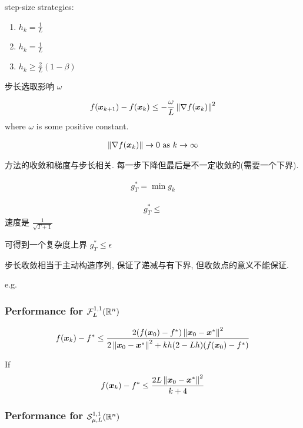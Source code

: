 step-size strategies:
\begin{enumerate}
    \item $h_k=\frac{1}{L}$
    \item $h_k=\frac{1}{L}$
    \item $h_k\ge \frac{2}{L}(1-\beta)$
\end{enumerate}
步长选取影响 $\omega$

\begin{align*}
    f(\bm{x}_{k+1})-f(\bm{x}_k)\le -\frac{\omega}{L}\left\lVert\nabla f(\bm{x}_k)\right\rVert^2
\end{align*}
where $\omega$ is some positive constant. 

\begin{align*}
    \left\lVert\nabla f(\bm{x}_k)\right\rVert\to 0\text{ as }k\to \infty
\end{align*}

方法的收敛和梯度与步长相关. 每一步下降但最后是不一定收敛的(需要一个下界). 

\begin{align*}
    g_T^*=\min g_k
\end{align*}

\begin{align*}
    g_T^*\le 
\end{align*}
速度是 $\frac{1}{\sqrt{T+1}}$

可得到一个复杂度上界 $g_T^*\le \epsilon$

步长收敛相当于主动构造序列, 保证了递减与有下界, 但收敛点的意义不能保证. 

e.g. 


\subsubsection{Performance for \texorpdfstring{$\mathcal{F}_L^{1,1}(\mathbb{R}^n)$}. }
\begin{theorem}
    \begin{align*}
        f(\bm{x}_k)-f^*\le \frac{2(f(\bm{x}_0)-f^*)\left\lVert\bm{x}_0-\bm{x}^*\right\rVert^2}{2\left\lVert\bm{x}_0-\bm{x}^*\right\rVert^2+kh(2-Lh)(f(\bm{x}_0)-f^*)}
    \end{align*}
\end{theorem}

\begin{corollary}
    If 
    \begin{align*}
        f(\bm{x}_k)-f^*\le\frac{2L\left\lVert\bm{x}_0-\bm{x}^*\right\rVert^2}{k+4}
    \end{align*}
\end{corollary}


\subsubsection{Performance for \texorpdfstring{$\mathcal{S}_{\mu,L}^{1,1}(\mathbb{R}^n)$}. }

